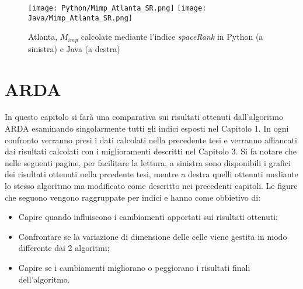 \begin{figure}[h]
    \begin{center}
    \texttt{[image: Python/Mimp\_Atlanta\_SR.png]}
    \texttt{[image: Java/Mimp\_Atlanta\_SR.png]}
    \caption[AT_SR]{
        Atlanta, $M_{imp}$ calcolate mediante l'indice \textit{spaceRank}
        in Python (a sinistra) e Java (a destra)
    }
    \label{etichetta}
    \end{center}
\end{figure}

\clearpage
\section{ARDA}
In questo capitolo si far\`a una comparativa sui risultati ottenuti dall'algoritmo
ARDA esaminando singolarmente tutti gli indici esposti nel Capitolo 1.
In ogni confronto verranno presi i dati calcolati nella precedente tesi e verranno
affiancati dai risultati calcolati con i miglioramenti descritti nel Capitolo 3.
Si fa notare che nelle seguenti pagine, per facilitare la lettura, a sinistra sono
disponibili i grafici dei risultati ottenuti nella prcedente tesi, mentre a destra
quelli ottenuti mediante lo stesso algoritmo ma modificato come descritto nei
precedenti capitoli.
Le figure che seguono vengono raggruppate per indici e hanno come obbietivo di:
\begin{itemize}
\item Capire quando influiscono i cambiamenti apportati sui risultati ottenuti;
\item Confrontare se la variazione di dimensione delle celle viene gestita in modo differente dai 2 algoritmi;
\item Capire se i cambiamenti migliorano o peggiorano i risultati finali dell'algoritmo.
\end{itemize}

